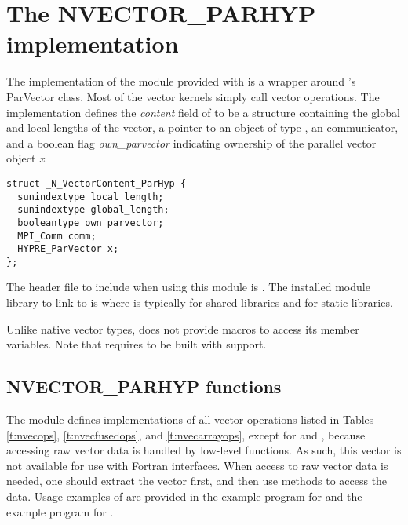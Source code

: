 %
\section{The NVECTOR\_PARHYP implementation}\label{ss:nvec_parhyp}

The {\nvecph} implementation of the {\nvector} module provided with
{\sundials} is a wrapper around {\hypre}'s ParVector class. 
Most of the vector kernels simply call {\hypre} vector operations. 
The implementation defines the {\em content} field of  to 
be a structure containing the global and local lengths of the vector, a 
pointer to an object of type , an {\mpi} communicator, 
and a boolean flag {\em own\_parvector} indicating ownership of the
{\hypre} parallel vector object {\em x}.
\begin{verbatim}
struct _N_VectorContent_ParHyp {
  sunindextype local_length;
  sunindextype global_length;
  booleantype own_parvector;
  MPI_Comm comm;
  HYPRE_ParVector x;
};
\end{verbatim}
The header file to include when using this module is .
The installed module library to link to is
where  is typically  for shared libraries and 
for static libraries.

Unlike native {\sundials} vector types, {\nvecph} does not provide macros 
to access its member variables.
Note that {\nvecph} requires {\sundials} to be built with {\mpi} support.


\subsection{NVECTOR\_PARHYP functions}
\label{ss:nvec_parhyp_functions}

The {\nvecph} module defines implementations of all vector operations 
listed in Tables \ref{t:nvecops}, \ref{t:nvecfusedops}, and \ref{t:nvecarrayops}, except
for  and , because accessing raw vector
data is handled by low-level {\hypre} functions.
As such, this vector is not available for use with {\sundials} Fortran interfaces.
When access to raw vector data is needed, one
should extract the {\hypre} vector first, and then use {\hypre}
methods to access the data. Usage examples of {\nvecph} are provided in
the  example program for {\cvode} \cite{cvode_ex}
and the  example program for {\arkode} \cite{arkode_ex}.

